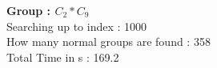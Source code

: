 \textbf{Group : $C_2*C_9$}\\
Searching up to index : 1000\\
How many normal groups are found : 358\\
Total Time in s : 169.2\\
